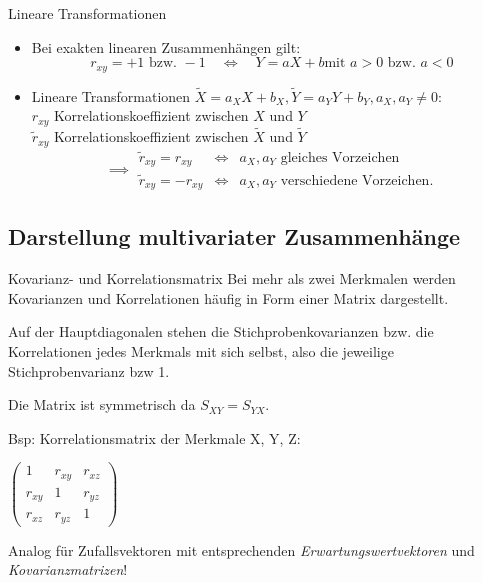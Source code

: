 \documentclass[
  10pt,
  ignorenonframetext,
]{beamer}
\providecommand{\tightlist}{%
  \setlength{\itemsep}{0pt}\setlength{\parskip}{0pt}}
\begin{document}
\begin{frame}{Lineare Transformationen}
\label{lineare-transformationen}
\begin{itemize}
\tightlist
\item
  Bei exakten linearen Zusammenhängen gilt: \[
             r_{xy} = +1 \mbox{ bzw. }-1 \quad \iff \quad Y = aX+b
  \mbox{
             mit }a > 0 \mbox{ bzw. }a < 0
         \]
\item
  Lineare Transformationen
  \(\tilde{X} = a_X X+b_X, \tilde{Y} = a_Y Y+b_Y, a_X, a_Y \neq
  0\):\\
  \(r_{xy}\) Korrelationskoeffizient zwischen \(X\) und \(Y\)\\
  \(\tilde{r}_{xy}\) Korrelationskoeffizient zwischen \(\tilde{X}\) und
  \(\tilde{Y}\) \[
         \implies \begin{array}{lcl}
   \tilde{r}_{xy} = r_{xy} & \iff & a_X, a_Y \text{ gleiches Vorzeichen}\\
   \tilde{r}_{xy} = -r_{xy} & \iff & a_X, a_Y \text{ verschiedene Vorzeichen}.
   \end{array}
         \]
\end{itemize}
\end{frame}

\subsection{Darstellung multivariater
Zusammenhänge}\label{darstellung-multivariater-zusammenhuxe4nge}

\begin{frame}{Kovarianz- und Korrelationsmatrix}
\label{kovarianz--und-korrelationsmatrix}
Bei mehr als zwei Merkmalen werden Kovarianzen und Korrelationen häufig
in Form einer Matrix dargestellt.

Auf der Hauptdiagonalen stehen die Stichprobenkovarianzen bzw. die
Korrelationen jedes Merkmals mit sich selbst, also die jeweilige
Stichprobenvarianz bzw 1.

Die Matrix ist symmetrisch da \(S_{XY} = S_{YX}\).

Bsp: Korrelationsmatrix der Merkmale X, Y, Z:

\begin{center}
$\left( \begin{array}{ccc}
  1 & r_{xy} & r_{xz} \\
  r_{xy} & 1 & r_{yz} \\
  r_{xz} & r_{yz} & 1
\end{array} \right)$
\end{center}

Analog für Zufallsvektoren mit entsprechenden
\emph{Erwartungswertvektoren} und \emph{Kovarianzmatrizen}!
\end{frame}
\end{document}
